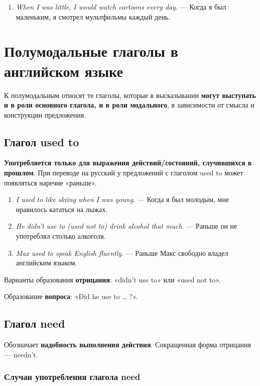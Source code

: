 \documentclass{article}
\begin{document}
\begin{enumerate}
	\item \emph{When I was little, I would watch cartoons every day}. — Когда я был маленьким, я смотрел мультфильмы каждый день. 
\end{enumerate}

\pagebreak
\section{Полумодальные глаголы в английском языке}

К полумодальным относят те глаголы, которые в высказывании \textbf{могут выступать и в роли основного глагола, и в роли модального}, в зависимости от смысла и конструкции предложения.

\subsection{Глагол \textbf{used to}}

\textbf{Употребляется только для выражения действий/состояний, случившихся в прошлом}. При переводе на русский у предложений с глаголом used to может появляться наречие «раньше». 

\begin{enumerate}
	\item \emph{I used to like skiing when I was young}. — Когда я был молодым, мне нравилось кататься на лыжах. 
	\item \emph{He didn’t use to (used not to) drink alcohol that much}. — Раньше он не употреблял столько алкоголя. 
	\item \emph{Max used to speak English fluently}. — Раньше Макс свободно владел английским языком. 
\end{enumerate}

Варианты образования \textbf{отрицания}: «didn’t use to» или «used not to».

Образование \textbf{вопроса}: «Did he use to … ?». 

\subsection{Глагол \textbf{need}}

Обозначает \textbf{надобность выполнения действия}. Сокращенная форма отрицания — needn’t.

\subsubsection{Случаи употребления глагола need}
\end{document}
